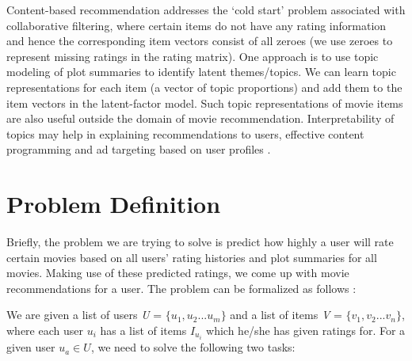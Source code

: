 \documentclass{article} %
\begin{document}
Content-based recommendation addresses the `cold start' problem associated with 
collaborative filtering, where certain items do not have any rating information 
and hence the corresponding item vectors consist of all zeroes (we use 
zeroes to represent missing ratings in the rating matrix). One approach is to 
use topic modeling of plot summaries to identify latent themes/topics. We 
can learn topic representations for each item (a vector of topic proportions) 
and add them to the item vectors in the latent-factor model. Such topic 
representations of movie items are also useful outside the domain
of movie recommendation. Interpretability of topics may help in explaining 
recommendations to users, effective content programming and ad targeting based
on user profiles \cite{fLDA}. 
 


\section{Problem Definition}

Briefly, the problem we are trying to solve is predict how highly a user will 
rate certain movies based on all users' rating histories and plot summaries for 
all movies. Making use of these predicted ratings, we come up with movie 
recommendations for a user. The problem can be formalized as follows 
\cite{grouplens} :

We are given a list of users \textit{U} = $\{u_{1}, u_{2} ... u_{m}\}$ and a 
list of items \textit{V} = $\{v_{1}, v_{2} ... v_{n}\}$, where each user $u_{i}$
has a list of items $I_{u_{i}}$ which he/she has given ratings for. For a given
user $u_{a} \in \textit{U}$, we need to solve the following two tasks:
\end{document}
